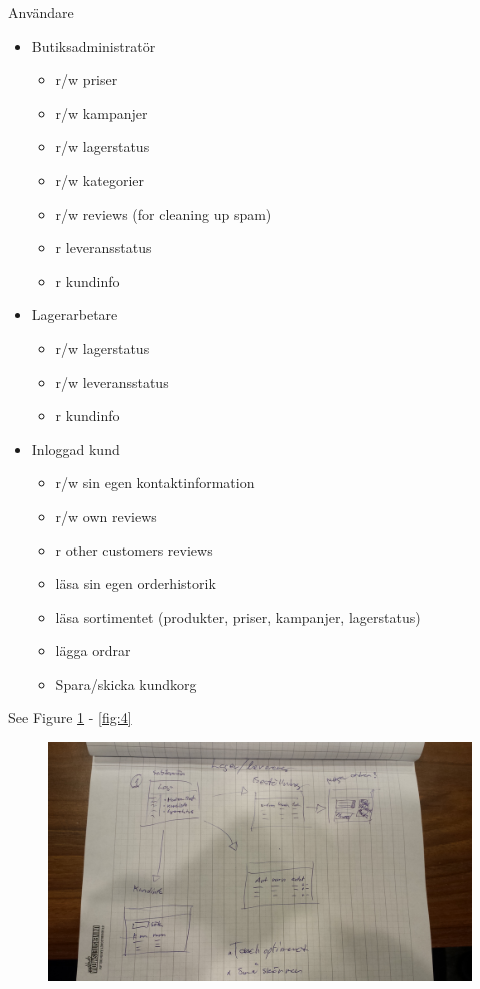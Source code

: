\documentclass[paper=a4, fontsize=11pt]{report} %
\begin{document}
Användare
\begin{itemize}
	\item Butiksadministratör
		\begin{itemize}
			\item r/w priser
			\item r/w kampanjer
			\item r/w lagerstatus
			\item r/w kategorier
			\item r/w reviews (for cleaning up spam)
			\item r leveransstatus
			\item r kundinfo
		\end{itemize}
	\item Lagerarbetare
		\begin{itemize}
			\item r/w lagerstatus
			\item r/w leveransstatus
			\item r kundinfo
		\end{itemize}
	\item Inloggad kund
		\begin{itemize}
			\item r/w sin egen kontaktinformation
			\item r/w own reviews
			\item r other customers reviews
			\item läsa sin egen orderhistorik
			\item läsa sortimentet (produkter, priser, kampanjer, lagerstatus)
			\item lägga ordrar
			\item Spara/skicka kundkorg
		\end{itemize}
	\end{itemize}

	See Figure \ref{fig:2} - \ref{fig:4}

	\begin{figure}
		\includegraphics[scale=0.12]{artifacts/Lager.jpeg}
		\caption{}
		\label{fig:2}
	\end{figure}
\end{document}
